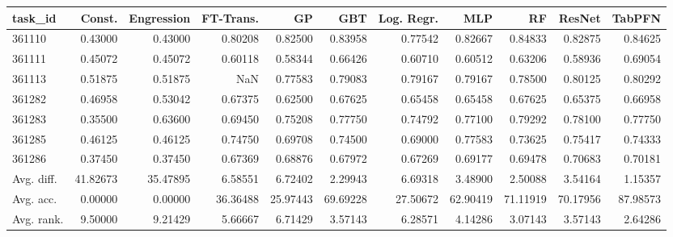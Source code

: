 \begin{tabular}{lrrrrrrrrrr}
\toprule
task\_id & Const. & Engression & FT-Trans. & GP & GBT & Log. Regr. & MLP & RF & ResNet & TabPFN \\
\midrule
361110 & 0.43000 & 0.43000 & 0.80208 & 0.82500 & 0.83958 & 0.77542 & 0.82667 & 0.84833 & 0.82875 & 0.84625 \\
361111 & 0.45072 & 0.45072 & 0.60118 & 0.58344 & 0.66426 & 0.60710 & 0.60512 & 0.63206 & 0.58936 & 0.69054 \\
361113 & 0.51875 & 0.51875 & NaN & 0.77583 & 0.79083 & 0.79167 & 0.79167 & 0.78500 & 0.80125 & 0.80292 \\
361282 & 0.46958 & 0.53042 & 0.67375 & 0.62500 & 0.67625 & 0.65458 & 0.65458 & 0.67625 & 0.65375 & 0.66958 \\
361283 & 0.35500 & 0.63600 & 0.69450 & 0.75208 & 0.77750 & 0.74792 & 0.77100 & 0.79292 & 0.78100 & 0.77750 \\
361285 & 0.46125 & 0.46125 & 0.74750 & 0.69708 & 0.74500 & 0.69000 & 0.77583 & 0.73625 & 0.75417 & 0.74333 \\
361286 & 0.37450 & 0.37450 & 0.67369 & 0.68876 & 0.67972 & 0.67269 & 0.69177 & 0.69478 & 0.70683 & 0.70181 \\
Avg. diff. & 41.82673 & 35.47895 & 6.58551 & 6.72402 & 2.29943 & 6.69318 & 3.48900 & 2.50088 & 3.54164 & 1.15357 \\
Avg. acc. & 0.00000 & 0.00000 & 36.36488 & 25.97443 & 69.69228 & 27.50672 & 62.90419 & 71.11919 & 70.17956 & 87.98573 \\
Avg. rank. & 9.50000 & 9.21429 & 5.66667 & 6.71429 & 3.57143 & 6.28571 & 4.14286 & 3.07143 & 3.57143 & 2.64286 \\
\bottomrule
\end{tabular}

